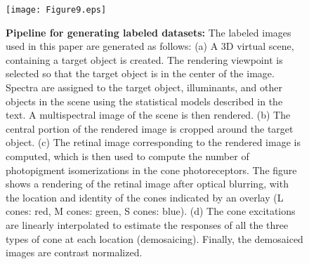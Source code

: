 \documentclass{jov}
\begin{document}
\begin{figure}
\centering
    \texttt{[image: Figure9.eps]}
    \label{fig:sceneWithCroppedImage}
    \caption{{\bf Pipeline for generating labeled datasets:}  The labeled images used in this paper are generated as follows: (a) A 3D virtual scene, containing a target object is created. The rendering viewpoint is selected so that the target object is in the center of the image. Spectra are assigned to the target object, illuminants, and other objects in the scene using the statistical models described in the text. A multispectral image of the scene is then rendered. (b) The central portion of the rendered image is cropped around the target object. (c) The retinal image corresponding to the rendered image is computed, which is then used to compute the number of photopigment isomerizations in the cone photoreceptors. The figure shows a rendering of the retinal image after optical blurring, with the location and identity of the cones indicated by an overlay (L cones: red, M cones: green, S cones: blue).  (d) The cone excitations are linearly interpolated to estimate the responses of all the three types of cone at each location (demosaicing). Finally, the demosaiced images are contrast normalized.}
\label{fig:figure9}
\end{figure}
\end{document}
